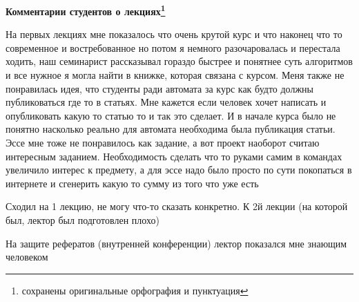 		\textbf{Комментарии студентов о лекциях\protect\footnote{сохранены оригинальные орфография и пунктуация}} 
            \begin{commentbox} 
                На первых лекциях мне показалось что очень крутой курс и что наконец что то современное и востребованное но потом я немного разочаровалась и перестала ходить, наш семинарист рассказывал гораздо быстрее и понятнее суть алгоритмов и все нужное я могла найти в книжке, которая связана с курсом. 
                Меня также не понравилась идея, что студенты ради автомата за курс как будто должны публиковаться где то в статьях. Мне кажется если человек хочет написать и опубликовать какую то статью то и так это сделает. И в начале курса было не понятно насколько реально для автомата необходима была публикация статьи. Эссе мне тоже не понравилось как задание, а вот проект наоборот считаю интересным заданием. Необходимость сделать что то руками самим в командах увеличило интерес к предмету, а для эссе надо было просто по сути покопаться в интернете и сгенерить какую то сумму из того что уже есть 
            \end{commentbox} 

            \begin{commentbox} 
                Сходил на 1 лекцию, не могу что-то сказать конкретно. К 2й лекции (на которой был, лектор был подготовлен плохо)

                На защите рефератов (внутренней конференции) лектор показался мне знающим человеком 
            \end{commentbox}   
    
    
